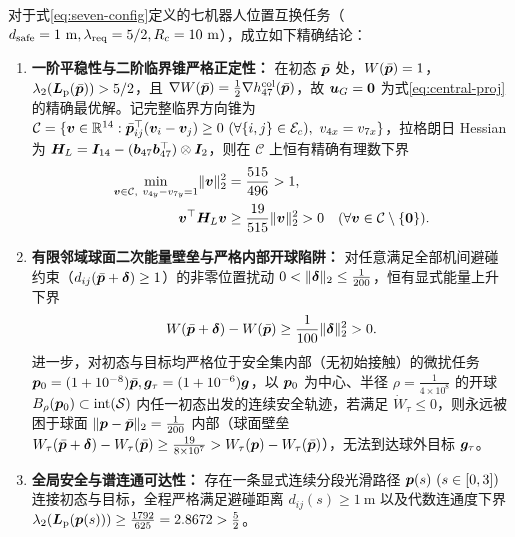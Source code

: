 \begin{theorem}[七机器人对称接触构型的严格局部极小有理数证书与能量壁垒]\label{thm:seven-kkt}
对于式\eqref{eq:seven-config}定义的七机器人位置互换任务（$d_{\mathrm{safe}}=1\ \mathrm m,\lambda_{\mathrm{req}}=5/2,R_c=10\ \mathrm m$），成立如下精确结论：
\begin{enumerate}
 \item \textbf{一阶平稳性与二阶临界锥严格正定性：} 在初态 $\bar{\boldsymbol{p}}$ 处，$W(\bar{\boldsymbol{p}})=1$，$\lambda_2(\boldsymbol{L}_{\mathrm{p}}(\bar{\boldsymbol{p}}))>5/2$，且 $\nabla W(\bar{\boldsymbol{p}})=\frac12\nabla h_{47}^{\mathrm{col}}(\bar{\boldsymbol{p}})$，故 $\boldsymbol{u}_G=\boldsymbol 0$ 为式\eqref{eq:central-proj}的精确最优解。记完整临界方向锥为 $\mathcal C=\{\boldsymbol v\in\mathbb R^{14}:\bar\bp_{ij}^{\top}(\boldsymbol v_i-\boldsymbol v_j)\ge 0\ (\forall\{i,j\}\in\mathcal E_c),\ v_{4x}=v_{7x}\}$，拉格朗日 Hessian 为 $\boldsymbol H_L=\boldsymbol{I}_{14}-(\boldsymbol b_{47}\boldsymbol b_{47}^{\top})\otimes\boldsymbol{I}_2$，则在 $\mathcal C$ 上恒有精确有理数下界
 \begin{equation}
\begin{split}
  \min_{\boldsymbol v\in\mathcal C,\ v_{4y}-v_{7y}=1}\lVert\boldsymbol v\rVert_2^2&=\frac{515}{496}>1,\\
  \boldsymbol v^{\top}\boldsymbol H_L\boldsymbol v&\ge\frac{19}{515}\lVert\boldsymbol v\rVert_2^2>0\quad(\forall\boldsymbol v\in\mathcal C\setminus\{\boldsymbol 0\}).
\end{split}
  \label{eq:critical-hessian}
 \end{equation}
 \item \textbf{有限邻域球面二次能量壁垒与严格内部开球陷阱：} 对任意满足全部机间避碰约束（$d_{ij}(\bar{\boldsymbol{p}}+\boldsymbol\delta)\ge 1$）的非零位置扰动 $0<\lVert\boldsymbol\delta\rVert_2\le\frac1{200}$，恒有显式能量上升下界
 \begin{equation}
  W(\bar{\boldsymbol{p}}+\boldsymbol\delta)-W(\bar{\boldsymbol{p}})\ge\frac{1}{100}\lVert\boldsymbol\delta\rVert_2^2>0.
  \label{eq:finite-barrier}
 \end{equation}
 进一步，对初态与目标均严格位于安全集内部（无初始接触）的微扰任务 $\boldsymbol{p}_0=(1+10^{-8})\bar{\boldsymbol{p}},\boldsymbol{g}_\tau=(1+10^{-6})\boldsymbol{g}$，以 $\boldsymbol{p}_0$ 为中心、半径 $\rho=\frac1{4\times 10^8}$ 的开球 $B_\rho(\boldsymbol{p}_0)\subset\operatorname{int}(\mathcal S)$ 内任一初态出发的连续安全轨迹，若满足 $\dot W_\tau\le 0$，则永远被困于球面 $\lVert\boldsymbol{p}-\bar{\boldsymbol{p}}\rVert_2=\frac1{200}$ 内部（球面壁垒 $W_\tau(\bar{\boldsymbol{p}}+\boldsymbol\delta)-W_\tau(\bar{\boldsymbol{p}})\ge\frac{19}{8\times 10^7}>W_\tau(\boldsymbol{p})-W_\tau(\bar{\boldsymbol{p}})$），无法到达球外目标 $\boldsymbol{g}_\tau$。
 \item \textbf{全局安全与谱连通可达性：} 存在一条显式连续分段光滑路径 $\bp(s)\ (s\in[0,3])$ 连接初态与目标，全程严格满足避碰距离 $d_{ij}(s)\ge 1\ \mathrm m$ 以及代数连通度下界 $\lambda_2(\boldsymbol{L}_{\mathrm{p}}(\boldsymbol{p}(s)))\ge\frac{1792}{625}=2.8672>\frac52$。
\end{enumerate}
\end{theorem}
